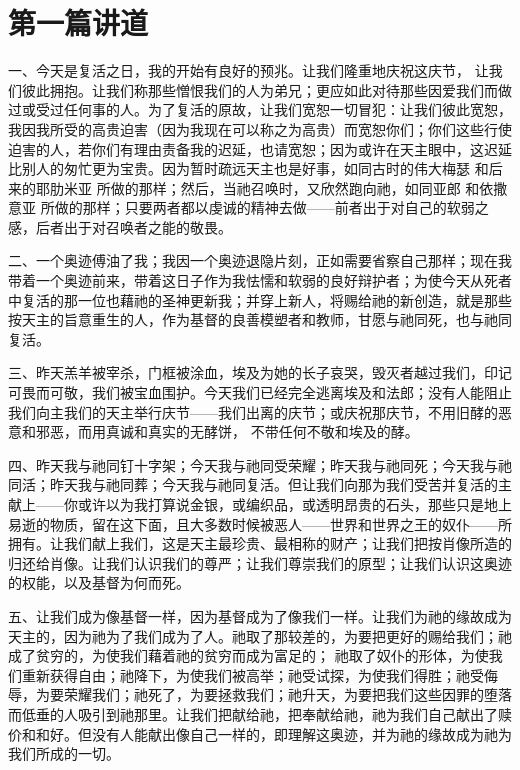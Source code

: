 \section{第一篇讲道}

\par

一、今天是复活之日，我的开始有良好的预兆。让我们隆重地庆祝这庆节， 让我们彼此拥抱。让我们称那些憎恨我们的人为弟兄；更应如此对待那些因爱我们而做过或受过任何事的人。为了复活的原故，让我们宽恕一切冒犯：让我们彼此宽恕，我因我所受的高贵迫害（因为我现在可以称之为高贵）而宽恕你们；你们这些行使迫害的人，若你们有理由责备我的迟延，也请宽恕；因为或许在天主眼中，这迟延比别人的匆忙更为宝贵。因为暂时疏远天主也是好事，如同古时的伟大梅瑟  和后来的耶肋米亚  所做的那样；然后，当祂召唤时，又欣然跑向祂，如同亚郎  和依撒意亚  所做的那样；只要两者都以虔诚的精神去做——前者出于对自己的软弱之感，后者出于对召唤者之能的敬畏。\par

二、一个奥迹傅油了我；我因一个奥迹退隐片刻，正如需要省察自己那样；现在我带着一个奥迹前来，带着这日子作为我怯懦和软弱的良好辩护者；为使今天从死者中复活的那一位也藉祂的圣神更新我；并穿上新人，将赐给祂的新创造，就是那些按天主的旨意重生的人，作为基督的良善模塑者和教师，甘愿与祂同死，也与祂同复活。\par

三、昨天羔羊被宰杀，门框被涂血，埃及为她的长子哀哭，毁灭者越过我们，印记可畏而可敬，我们被宝血围护。今天我们已经完全逃离埃及和法郎；没有人能阻止我们向主我们的天主举行庆节——我们出离的庆节；或庆祝那庆节，不用旧酵的恶意和邪恶，而用真诚和真实的无酵饼， 不带任何不敬和埃及的酵。\par

四、昨天我与祂同钉十字架；今天我与祂同受荣耀；昨天我与祂同死；今天我与祂同活；昨天我与祂同葬；今天我与祂同复活。但让我们向那为我们受苦并复活的主献上——你或许以为我打算说金银，或编织品，或透明昂贵的石头，那些只是地上易逝的物质，留在这下面，且大多数时候被恶人——世界和世界之王的奴仆——所拥有。让我们献上我们，这是天主最珍贵、最相称的财产；让我们把按肖像所造的归还给肖像。让我们认识我们的尊严；让我们尊崇我们的原型；让我们认识这奥迹的权能，以及基督为何而死。\par

五、让我们成为像基督一样，因为基督成为了像我们一样。让我们为祂的缘故成为天主的，因为祂为了我们成为了人。祂取了那较差的，为要把更好的赐给我们；祂成了贫穷的，为使我们藉着祂的贫穷而成为富足的； 祂取了奴仆的形体，为使我们重新获得自由；祂降下，为使我们被高举；祂受试探，为使我们得胜；祂受侮辱，为要荣耀我们；祂死了，为要拯救我们；祂升天，为要把我们这些因罪的堕落而低垂的人吸引到祂那里。让我们把献给祂，把奉献给祂，祂为我们自己献出了赎价和和好。但没有人能献出像自己一样的，即理解这奥迹，并为祂的缘故成为祂为我们所成的一切。\par

